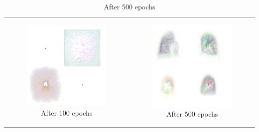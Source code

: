 \documentclass[conference]{IEEEtran}
\begin{document}
\begin{table}[ht]
\begin{tabular}{cc}
\begin{subfigure}{0.23\textwidth}\centering\includegraphics[width=1\columnwidth]{resources/gen_fmnist/ex100_adv.png}\caption{After 100 epochs}\label{fig:taba}\end{subfigure}&
\begin{subfigure}{0.23\textwidth}\centering\includegraphics[width=1\columnwidth]{resources/gen_fmnist/ex500_adv.png}\caption{After 500 epochs}\label{fig:tabb}\end{subfigure}\\

\end{tabular}
\end{table}
\end{document}
